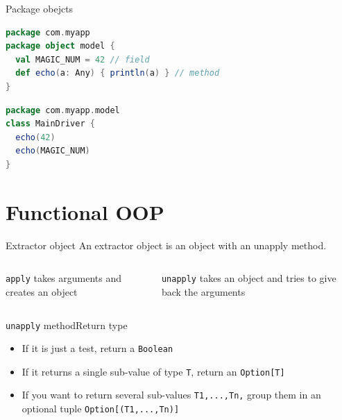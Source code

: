 \documentclass[aspectratio=169]{beamer}
\begin{document}
\begin{frame}[fragile]{Package obejcts}
\begin{lstlisting}[style=scala,language=scala]
package com.myapp
package object model {
  val MAGIC_NUM = 42 // field
  def echo(a: Any) { println(a) } // method
}
\end{lstlisting}
\pause
\begin{lstlisting}[style=scala,language=scala]
package com.myapp.model
class MainDriver {
  echo(42)
  echo(MAGIC_NUM)
}
\end{lstlisting}
\end{frame}


\section{Functional OOP}

\begin{frame}{Extractor object}
  \centering\large An extractor object is an object with an unapply method.
  \vspace{2em}
  \begin{columns}[T]
    \begin{column}{0.5\textwidth}
      \begin{block}{\texttt{apply}}
       takes arguments and creates an object
      \end{block} 
    \end{column}
    \begin{column}{0.5\textwidth}
      \begin{block}{\texttt{unapply}}
       takes an object and tries to give back the arguments
      \end{block} 
    \end{column}
  \end{columns}
\end{frame}

\begin{frame}{\texttt{unapply} method}{Return type}
  \begin{itemize}
    \item If it is just a test, return a \texttt{Boolean}
    \item If it returns a single sub-value of type \texttt{T}, return an \texttt{Option[T]}
    \item If you want to return several sub-values \texttt{T1,...,Tn,} group them in an optional tuple \texttt{Option[(T1,...,Tn)]}
  \end{itemize}
\end{frame}
\end{document}
